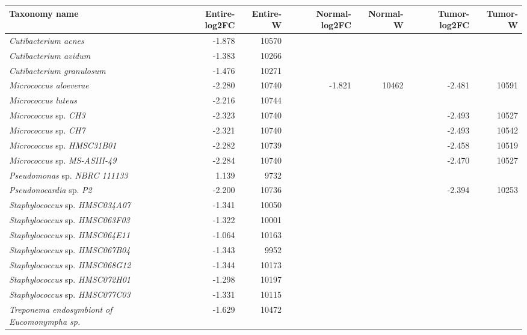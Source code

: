 \begin{tabular}{l|rr|rr|rr}
Taxonomy name & Entire-log2FC & Entire-W & Normal-log2FC & Normal-W & Tumor-log2FC & Tumor-W \\
\hline
\textit{Cutibacterium acnes} & -1.878 & 10570 &  &  &  &  \\
\textit{Cutibacterium avidum} & -1.383 & 10266 &  &  &  &  \\
\textit{Cutibacterium granulosum} & -1.476 & 10271 &  &  &  &  \\
\textit{Micrococcus aloeverae} & -2.280 & 10740 & -1.821 & 10462 & -2.481 & 10591 \\
\textit{Micrococcus luteus} & -2.216 & 10744 &  &  &  &  \\
\textit{Micrococcus} sp. \textit{CH3} & -2.323 & 10740 &  &  & -2.493 & 10527 \\
\textit{Micrococcus} sp. \textit{CH7} & -2.321 & 10740 &  &  & -2.493 & 10542 \\
\textit{Micrococcus} sp. \textit{HMSC31B01} & -2.282 & 10739 &  &  & -2.458 & 10519 \\
\textit{Micrococcus} sp. \textit{MS-ASIII-49} & -2.284 & 10740 &  &  & -2.470 & 10527 \\
\textit{Pseudomonas} sp. \textit{NBRC 111133} & 1.139 & 9732 &  &  &  &  \\
\textit{Pseudonocardia} sp. \textit{P2} & -2.200 & 10736 &  &  & -2.394 & 10253 \\
\textit{Staphylococcus} sp. \textit{HMSC034A07} & -1.341 & 10050 &  &  &  &  \\
\textit{Staphylococcus} sp. \textit{HMSC063F03} & -1.322 & 10001 &  &  &  &  \\
\textit{Staphylococcus} sp. \textit{HMSC064E11} & -1.064 & 10163 &  &  &  &  \\
\textit{Staphylococcus} sp. \textit{HMSC067B04} & -1.343 & 9952 &  &  &  &  \\
\textit{Staphylococcus} sp. \textit{HMSC068G12} & -1.344 & 10173 &  &  &  &  \\
\textit{Staphylococcus} sp. \textit{HMSC072H01} & -1.298 & 10197 &  &  &  &  \\
\textit{Staphylococcus} sp. \textit{HMSC077C03} & -1.331 & 10115 &  &  &  &  \\
\textit{Treponema endosymbiont of Eucomonympha sp.} & -1.629 & 10472 &  &  &  & 
\end{tabular}